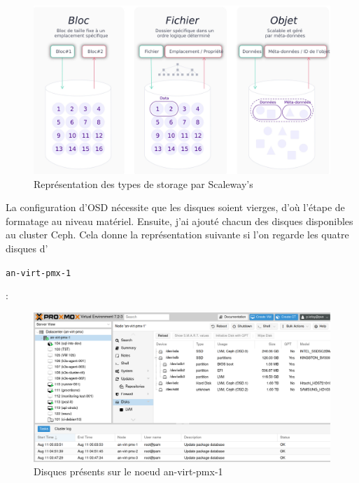 \documentclass[12pt, a4paper, twoside]{article}
\begin{document}
\begin{figure}[ht!]
    \centering
        \includegraphics[width=\textwidth]{src/graph_storage.jpeg}
    \caption{Représentation des types de storage par Scaleway's \cite{Scaleway}}
    \label{fig:storage_types}
\end{figure}

\newpage
La configuration d'\gls{OSD} nécessite que les disques soient vierges, d'où l'étape de formatage au niveau matériel.
Ensuite, j'ai ajouté chacun des disques disponibles au \gls{cluster} \gls{Ceph}.
Cela donne la représentation suivante si l'on regarde les quatre disques d'\begin{code}\texttt{an-virt-pmx-1}\end{code}:

\begin{figure}[ht!]
    \centering
        \includegraphics[width=\textwidth]{src/interface_proxmox_disk.png}
    \caption{Disques présents sur le noeud an-virt-pmx-1}
    \label{fig:disk_node1}
\end{figure}
\end{document}
